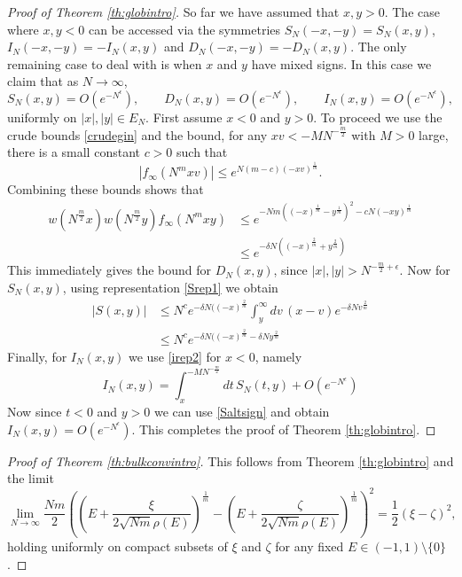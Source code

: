 \documentclass[11pt,reqno]{amsproc}
\numberwithin{equation}{section}
\numberwithin{theorem}{section}
\begin{document}
\begin{proof}[Proof of Theorem \ref{th:globintro}]
So far we have assumed that $x,y > 0$. The case where $x,y < 0$ can be accessed via the symmetries $S_{N}(-x,-y) = S_{N}(x,y)$, $I_{N}(-x,-y) = -I_{N}(x,y)$ and $D_{N}(-x,-y) = -D_{N}(x,y)$. The only remaining case to deal with is when $x$ and $y$ have mixed signs. In this case we claim that as $N \to \infty$,
\begin{equation}
S_{N}(x,y) = O(e^{-N^{\epsilon}}), \qquad D_{N}(x,y) = O(e^{-N^{\epsilon}}), \qquad I_{N}(x,y) = O(e^{-N^{\epsilon}}),\end{equation}
uniformly on $|x|, |y| \in E_{N}$. First assume $x<0$ and $y>0$. To proceed we use the crude bounds \eqref{crudegin} and the bound, for any $xv<-MN^{-\frac{m}{2}}$ with $M>0$ large, there is a small constant $c>0$ such that
\begin{equation}
|f_{\infty}(N^{m}xv)| \leq e^{N(m-c)(-xv)^{\frac{1}{m}}}.\end{equation}
Combining these bounds shows that
\begin{equation}
\begin{split}
w(N^{\frac{m}{2}}x)w(N^{\frac{m}{2}}y)f_{\infty}(N^{m}xy) &\leq e^{-Nm((-x)^{\frac{1}{m}}-y^{\frac{1}{m}})^{2}-cN(-xy)^{\frac{1}{m}}}\\
&\leq e^{-\delta N ((-x)^{\frac{2}{m}}+y^{\frac{2}{m}})}
\end{split}
\end{equation}
This immediately gives the bound for $D_{N}(x,y)$, since $|x|,|y| > N^{-\frac{m}{2}+\epsilon}$. Now for $S_{N}(x,y)$, using representation \eqref{Srep1} we obtain  
\begin{equation}
\begin{split}
|S(x,y)| &\leq N^{c}e^{-\delta N ((-x)^{\frac{2}{m}}}\int_{y}^{\infty}dv\,(x-v)e^{-\delta Nv^{\frac{2}{m}}}\\
&\leq N^{c}e^{-\delta N ((-x)^{\frac{2}{m}}-\delta N y^{\frac{2}{m}}} \label{Saltsign}
\end{split}
\end{equation}
Finally, for $I_{N}(x,y)$ we use \eqref{irep2} for $x<0$, namely
\begin{equation}
I_{N}(x,y) = \int_{x}^{-MN^{-\frac{m}{2}}}dt\,S_{N}(t,y) + O(e^{-N^{\epsilon}})
\end{equation}
Now since $t<0$ and $y>0$ we can use \eqref{Saltsign} and obtain $I_{N}(x,y) = O(e^{-N^{\epsilon}})$. This completes the proof of Theorem \ref{th:globintro}.
\end{proof}

\begin{proof}[Proof of Theorem \ref{th:bulkconvintro}]
This follows from Theorem \ref{th:globintro} and the limit
\begin{equation}
\lim_{N \to \infty}\frac{Nm}{2}\left(\left(E+\frac{\xi}{2\sqrt{Nm}\rho(E)}\right)^{\frac{1}{m}}-\left(E+\frac{\zeta}{2\sqrt{Nm}\rho(E)}\right)^{\frac{1}{m}}\right)^{2} = \frac{1}{2}(\xi-\zeta)^{2},
\end{equation}
holding uniformly on compact subsets of $\xi$ and $\zeta$ for any fixed $E \in (-1,1)\setminus\{0\}$. 
\end{proof}
\end{document}
